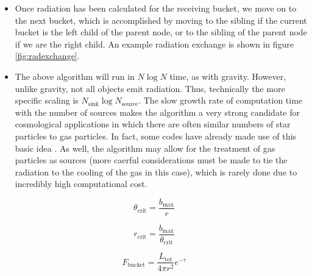 \begin{itemize}
\begin{enumerate}
	\end{enumerate}
\item Once radiation has been calculated for the receiving bucket, we move on to the next bucket, which is accomplished by moving to the sibling if the current bucket is the left child of the parent node, or to the sibling of the parent node if we are the right child. An example radiation exchange is shown in figure \ref{fig:radexchange}.
\item The above algorithm will run in $N\log{N}$ time, as with gravity. However, unlike gravity, not all objects emit radiation. Thus, technically the more specific scaling is $N_{\mbox{sink}}\log{N_{\mbox{source}}}$. The slow growth rate of computation time with the number of sources makes the algorithm a very strong candidate for cosmological applications in which there are often similar numbers of star particles to gas particles. In fact, some codes have already made use of this basic idea \citep{gnedinAbel01,hopkins, kannanEt14}. As well, the algorithm may allow for the treatment of gas particles as sources (more caerful considerations must be made to tie the radiation to the cooling of the gas in this case), which is rarely done due to incredibly high computational cost.
\end{itemize}

\begin{equation}
\label{eq:openingangle}
\theta_{\mbox{crit}} = \frac{b_{\mbox{max}}}{r}
\end{equation}

\begin{equation}
\label{eq:openingradius}
r_{\mbox{crit}} = \frac{b_{\mbox{max}}}{\theta_{\mbox{crit}}}
\end{equation}

\begin{equation}
\label{eq:bucketflux}
F_{\mbox{bucket}} = \frac{L_{\mbox{tot}}}{4\pi r^2}e^{-\tau}
\end{equation}

